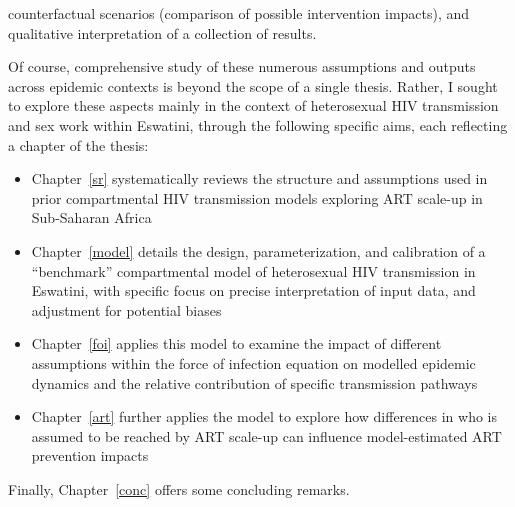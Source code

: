 counterfactual scenarios (\eg comparison of possible intervention impacts), and
qualitative interpretation of a collection of results.
\par
Of course, comprehensive study of these numerous assumptions and outputs
across epidemic contexts is beyond the scope of a single thesis.
Rather, I sought to explore these aspects mainly in the context of
heterosexual HIV transmission and sex work within Eswatini,
through the following specific aims, each reflecting a chapter of the thesis:
\begin{itemize}
  \item Chapter~\ref{sr} systematically reviews the structure and assumptions used in
  prior compartmental HIV transmission models exploring ART scale-up in Sub-Saharan Africa
  \item Chapter~\ref{model} details the design, parameterization, and calibration of
  a ``benchmark'' compartmental model of heterosexual HIV transmission in Eswatini,
  with specific focus on precise interpretation of input data, and adjustment for potential biases
  \item Chapter~\ref{foi} applies this model to examine
  the impact of different assumptions within the force of infection equation on
  modelled epidemic dynamics and the relative contribution of specific transmission pathways
  \item Chapter~\ref{art} further applies the model to explore
  how differences in who is assumed to be reached by ART scale-up
  can influence model-estimated ART prevention impacts
\end{itemize}
Finally, Chapter~\ref{conc} offers some concluding remarks.
